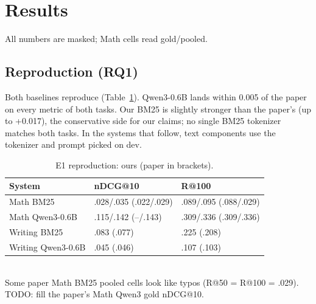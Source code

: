 \documentclass[conference]{IEEEtran}
\begin{document}
\section{Results}

All numbers are masked; Math cells read gold/pooled.

\subsection{Reproduction (RQ1)}
Both baselines reproduce (Table~\ref{tab:e1}). Qwen3-0.6B lands within 0.005 of the paper on every metric of both tasks. Our BM25 is slightly stronger than the paper's (up to +0.017), the conservative side for our claims; no single BM25 tokenizer matches both tasks. In the systems that follow, text components use the tokenizer and prompt picked on dev.

\begin{table}[t]
\centering
\caption{E1 reproduction: ours (paper in brackets).}
\label{tab:e1}
\footnotesize
\begin{tabular}{@{}lll@{}}
\toprule
System & nDCG@10 & R@100 \\
\midrule
Math BM25 & .028/.035 (.022/.029) & .089/.095 (.088/.029) \\
Math Qwen3-0.6B & .115/.142 (--/.143) & .309/.336 (.309/.336) \\
Writing BM25 & .083 (.077) & .225 (.208) \\
Writing Qwen3-0.6B & .045 (.046) & .107 (.103) \\
\bottomrule
\end{tabular}
\\[2pt]{\scriptsize Some paper Math BM25 pooled cells look like typos (R@50 = R@100 = .029). TODO: fill the paper's Math Qwen3 gold nDCG@10.}
\end{table}
\end{document}
